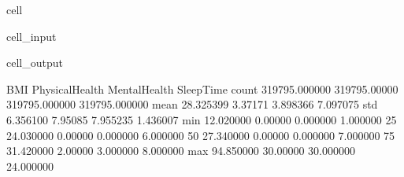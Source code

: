 \documentclass[letterpaper,10pt,english]{jupyterBook}
\begin{document}
\begin{sphinxuseclass}{cell}\begin{sphinxVerbatimInput}

\begin{sphinxuseclass}{cell_input}
\begin{sphinxVerbatim}[commandchars=\\\{\}]
\end{sphinxVerbatim}

\end{sphinxuseclass}\end{sphinxVerbatimInput}
\begin{sphinxVerbatimOutput}

\begin{sphinxuseclass}{cell_output}
\begin{sphinxVerbatim}[commandchars=\\\{\}]
                 BMI  PhysicalHealth   MentalHealth      SleepTime
count  319795.000000    319795.00000  319795.000000  319795.000000
mean       28.325399         3.37171       3.898366       7.097075
std         6.356100         7.95085       7.955235       1.436007
min        12.020000         0.00000       0.000000       1.000000
25\PYGZpc{}        24.030000         0.00000       0.000000       6.000000
50\PYGZpc{}        27.340000         0.00000       0.000000       7.000000
75\PYGZpc{}        31.420000         2.00000       3.000000       8.000000
max        94.850000        30.00000      30.000000      24.000000
\end{sphinxVerbatim}

\end{sphinxuseclass}\end{sphinxVerbatimOutput}

\end{sphinxuseclass}
\end{document}
